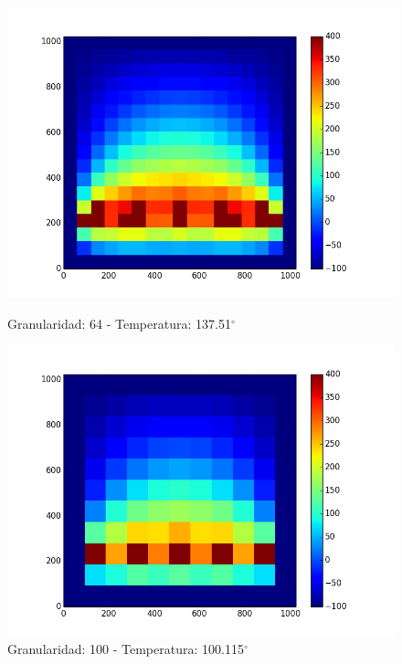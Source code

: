\begin{figure}[htb]
\begin{center}
\includegraphics[scale=0.3]{imagenes/caso3_64.png} 
\caption{Granularidad: 64 - Temperatura: 137.51$^{\circ}$} 
        \end{center}
\endminipage\hfill
{}
\begin{center}
\includegraphics[scale=0.3]{imagenes/caso3_100.png} 
\caption{Granularidad: 100 - Temperatura: 100.115$^{\circ}$} 
        \end{center}
\endminipage\hfill 
\end{figure}
\newpage
